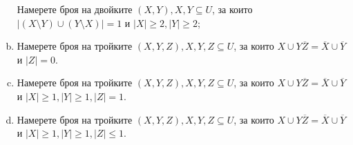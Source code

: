 \begin{prb}
\begin{enumerate}[a)]
    Намерете броя на двойките $(X,Y), X,Y\subseteq U$, за които $|(X\setminus Y)\cup(Y\setminus X)| = 1$ и 
    $|X|\geq 2, |Y|\geq 2$;
  \item
    Намерете броя на тройките $(X,Y,Z), X,Y,Z\subseteq U$, за които $X\cup Y\overline{Z} = \overline{X}\cup\overline{Y}$ и
    $|Z| = 0$.
  \item
    Намерете броя на тройките $(X,Y,Z), X,Y,Z\subseteq U$, за които $X\cup Y\overline{Z} = \overline{X}\cup\overline{Y}$ и
    $|X|\geq 1, |Y|\geq 1, |Z| = 1$.
  \item
    Намерете броя на тройките $(X,Y,Z), X,Y,Z\subseteq U$, за които $X\cup Y\overline{Z} = \overline{X}\cup\overline{Y}$ и
    $|X|\geq 1, |Y|\geq 1, |Z|\leq 1$.
  \end{enumerate}
\end{prb}


